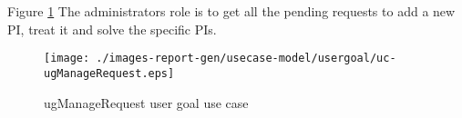 Figure \ref{fig:lu.uni.lassy.excalibur.MyCrash.G02-RE-UCD-uc-ugManageRequest}
The administrators role is to get all the pending requests to add a new PI, treat it and solve the specific PIs.

\begin{figure}[htbp]
\begin{center}

\texttt{[image: ./images-report-gen/usecase-model/usergoal/uc-ugManageRequest.eps]}
\end{center}
\caption[lu.uni.lassy.excalibur.MyCrash.G02 Use Case Diagram: uc-ugManageRequest]{ugManageRequest user goal use case}
\label{fig:lu.uni.lassy.excalibur.MyCrash.G02-RE-UCD-uc-ugManageRequest}
\end{figure}
\vspace{0.5cm}
